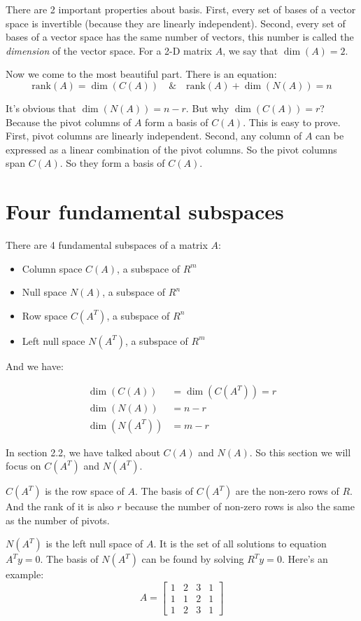 \documentclass[10pt,a4paper,oneside,numbers=noenddot]{scrbook}
\theoremstyle{ctplain}
\theoremstyle{ctresult}
\begin{document}
There are 2 important properties about basis. First, every set of bases of a vector
space is invertible (because they are linearly independent). Second, every set of bases of a vector
space has the same number of vectors, this number is called the \emph{dimension} of
the vector space. For a 2-D matrix $A$, we say that $\dim(A) = 2$.

Now we come to the most beautiful part. There is an equation:
\[
  \text{rank}(A) = \dim(C(A)) \quad \& \quad \text{rank}(A) + \dim(N(A)) = n
\]

It's obvious that $\dim(N(A)) = n - r$. But why $\dim(C(A)) = r$? Because the pivot
columns of $A$ form a basis of $C(A)$. This is easy to prove. First, pivot columns
are linearly independent. Second, any column of $A$ can be expressed as a linear
combination of the pivot columns. So the pivot columns span $C(A)$. So they form a
basis of $C(A)$.

\section{Four fundamental subspaces}

There are 4 fundamental subspaces of a matrix $A$:
\begin{itemize}
  \item Column space $C(A)$, a subspace of $R^{m}$
  \item Null space $N(A)$, a subspace of $R^{n}$
  \item Row space $C(A^{T})$, a subspace of $R^{n}$
  \item Left null space $N(A^{T})$, a subspace of $R^{m}$
\end{itemize}

And we have:

\begin{align*}
  \dim(C(A)) &= \dim(C(A^{T})) = r \\
  \dim(N(A)) &= n - r  \\
  \dim(N(A^{T})) &= m - r
\end{align*}

In section 2.2, we have talked about $C(A)$ and $N(A)$. So this section we will focus
on $C(A^{T})$ and $N(A^{T})$.

$C(A^{T})$ is the row space of $A$. The basis of $C(A^{T})$ are the non-zero rows of
$R$. And the rank of it is also $r$ because the number of non-zero rows is also the
same as the number of pivots.

$N(A^{T})$ is the left null space of $A$. It is the set of all solutions to equation
$A^{T}y = 0$. The basis of $N(A^{T})$ can be found by solving $R^{T}y = 0$. Here's
an example:
\[
  A = \begin{bmatrix}
    1 & 2 & 3 & 1 \\
    1 & 1 & 2 & 1 \\
    1 & 2 & 3 & 1
  \end{bmatrix}
\]
\end{document}

